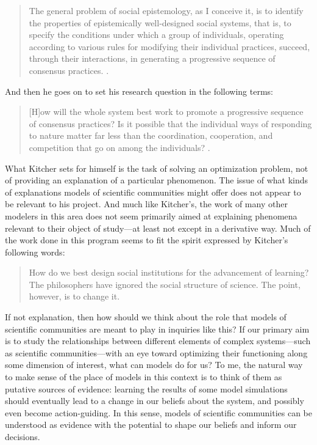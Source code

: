 \documentclass{article}
\begin{document}
\begin{quote}

    The general problem of social epistemology, as I conceive it, is to identify the properties of epistemically well-designed social systems, that is, to specify the conditions under which a group of individuals, operating according to various rules for modifying their individual practices, succeed, through their interactions, in generating a progressive sequence of consensus practices. \cite[p. 303]{kitcher.1995.AdvaScieScie}.
    
\end{quote}

And then he goes on to set his research question in the following terms:

\begin{quote}

    [H]ow will the whole system best work to promote a progressive sequence of consensus practices? Is it possible that the individual ways of responding to nature matter far less than the coordination, cooperation, and competition that go on among the individuals? \cite[p. 303]{kitcher.1995.AdvaScieScie}.
    
\end{quote}

What Kitcher sets for himself is the task of solving an optimization problem, not of providing an explanation of a particular phenomenon. The issue of what kinds of explanations models of scientific communities might offer does not appear to be relevant to his project. And much like Kitcher's, the work of many other modelers in this area does not seem primarily aimed at explaining phenomena relevant to their object of study—at least not except in a derivative way. Much of the work done in this program seems to fit the spirit expressed by Kitcher's following words:

\begin{quote}

    How do we best design social institutions for the advancement of learning? The philosophers have ignored the social structure of science. The point, however, is to change it.\cite[p.22]{Kitcher1990-KITTDO}

\end{quote}

If not explanation, then how should we think about the role that models of scientific communities are meant to play in inquiries like this? If our primary aim is to study the relationships between different elements of complex systems—such as scientific communities—with an eye toward optimizing their functioning along some dimension of interest, what can models do for us? To me, the natural way to make sense of the place of models in this context is to think of them as putative sources of evidence: learning the results of some model simulations should eventually lead to a change in our beliefs about the system, and possibly even become action-guiding. In this sense, models of scientific communities can be understood as evidence with the potential to shape our beliefs and inform our decisions.
\end{document}
